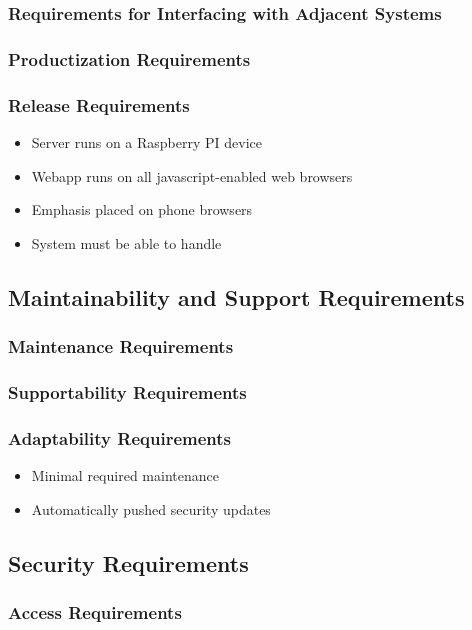 \documentclass[12pt, titlepage]{article}
\begin{document}
\subsubsection{Requirements for Interfacing with Adjacent Systems}
\subsubsection{Productization Requirements}
\subsubsection{Release Requirements}

\begin{itemize}
\item Server runs on a Raspberry PI device
\item Webapp runs on all javascript-enabled web browsers
\item Emphasis placed on phone browsers
\item System must be able to handle
\end{itemize}

\subsection{Maintainability and Support Requirements}
\subsubsection{Maintenance Requirements}
\subsubsection{Supportability Requirements}
\subsubsection{Adaptability Requirements}
\begin{itemize}
\item Minimal required maintenance
\item Automatically pushed security updates
\end{itemize}

\subsection{Security Requirements}
\subsubsection{Access Requirements}
\end{document}
